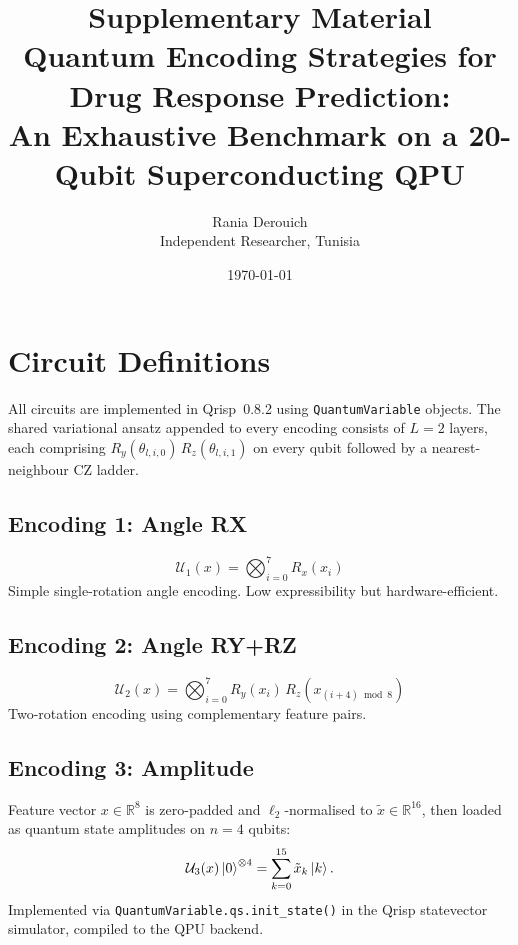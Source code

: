 \documentclass[12pt,a4paper]{article}
\title{\textbf{Supplementary Material}\\[6pt]
Quantum Encoding Strategies for Drug Response Prediction:\\
An Exhaustive Benchmark on a 20-Qubit Superconducting QPU}
\author{Rania Derouich\\Independent Researcher, Tunisia}
\date{\today}
\begin{document}
\maketitle
\tableofcontents
\newpage

\section{Circuit Definitions}
\label{sec:circuits}

All circuits are implemented in Qrisp~0.8.2 using \texttt{QuantumVariable}
objects. The shared variational ansatz appended to every encoding consists of
$L=2$ layers, each comprising $R_y(\theta_{l,i,0})\,R_z(\theta_{l,i,1})$
on every qubit followed by a nearest-neighbour CZ ladder.

\subsection{Encoding 1: Angle RX}
\begin{equation}
  \mathcal{U}_1(x) = \bigotimes_{i=0}^{7} R_x(x_i)
\end{equation}
Simple single-rotation angle encoding. Low expressibility but hardware-efficient.

\subsection{Encoding 2: Angle RY+RZ}
\begin{equation}
  \mathcal{U}_2(x) = \bigotimes_{i=0}^{7} R_y(x_i)\,R_z(x_{(i+4)\bmod 8})
\end{equation}
Two-rotation encoding using complementary feature pairs.

\subsection{Encoding 3: Amplitude}
Feature vector $x\in\mathbb{R}^8$ is zero-padded and $\ell_2$-normalised to
$\tilde{x}\in\mathbb{R}^{16}$, then loaded as quantum state amplitudes on
$n=4$ qubits:
\begin{equation}
  \mathcal{U}_3(x)\ket{0}^{\otimes 4} = \sum_{k=0}^{15}\tilde{x}_k\ket{k}.
\end{equation}
Implemented via \texttt{QuantumVariable.qs.init\_state()} in the Qrisp
statevector simulator, compiled to the QPU backend.
\end{document}
